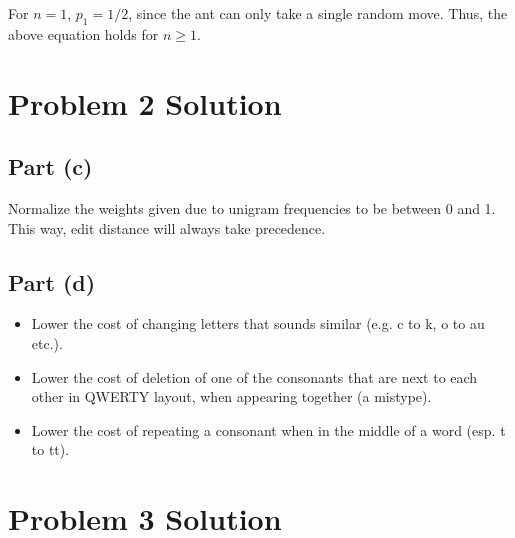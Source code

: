 \documentclass[11pt,a4paper,titlepage]{article}
\begin{document}
For $n = 1$, $p_1 = 1/2$, since the ant can only take a single random move.
Thus, the above equation holds for $n \ge 1$.


\section*{Problem 2 Solution}

\subsection*{Part (c)}

Normalize the weights given due to unigram frequencies to be between 0 and 1.
This way, edit distance will always take precedence.

\subsection*{Part (d)}

\begin{itemize}
    \item Lower the cost of changing letters that sounds similar (e.g. c to k,
        o to au etc.).
    \item Lower the cost of deletion of one of the consonants that are next to
        each other in QWERTY layout, when appearing together (a mistype).
    \item Lower the cost of repeating a consonant when in the middle of a word
        (esp. t to tt).
\end{itemize}


\section*{Problem 3 Solution}
\end{document}
